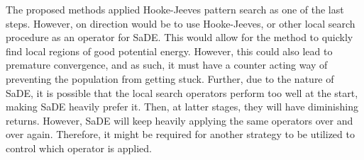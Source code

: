 The proposed methods applied Hooke-Jeeves pattern search as one of the last steps.
However, on direction would be to use Hooke-Jeeves, or other local search
procedure as an operator for SaDE. This would allow for the method to quickly
find local regions of good potential energy. However, this could also lead to
premature convergence, and as such, it must have a counter acting way of
preventing the population from getting stuck. Further, due to the nature of
SaDE, it is possible that the local search operators perform too well at the
start, making SaDE heavily prefer it. Then, at latter stages, they will
have diminishing returns. However, SaDE will keep heavily applying the
same operators over and over again. Therefore, it might be required for another
strategy to be utilized to control which operator is applied.
